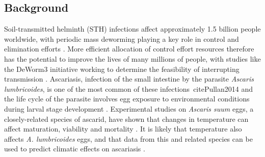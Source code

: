 \subsection{Background}

Soil-transmitted helminth (STH) infections affect approximately 1.5 billion people worldwide, with periodic mass deworming playing a key role in control and elimination efforts \cite{Pullan2014}. More efficient allocation of control effort resources therefore has the potential to improve the lives of many millions of people, with studies like the DeWorm3 initiative working to determine the feasibility of interrupting transmission \cite{Deworm3}. Ascariasis, infection of the small intestine by the parasite \textit{Ascaris lumbricoides}, is one of the most common of these infections\ cite{Pullan2014} and the life cycle of the parasite involves egg exposure to environmental conditions during larval stage development \cite{WHO}. Experimental studies on \textit{Ascaris suum} eggs, a closely-related species of ascarid, have shown that changes in temperature can affect maturation, viability and mortality \cite{Wagner,Arene,Kim}. It is likely that temperature also affects \textit{A. lumbricoides} eggs, and that data from this and related species can be used to predict climatic effects on ascariasis \cite{Boes,Johnson,Cruz}.

